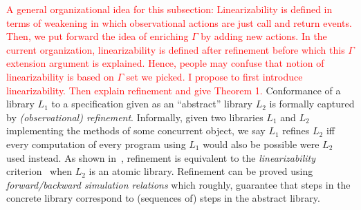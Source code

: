 \textcolor{red}{A general organizational idea for  this subsection: Linearizability is defined in terms of weakening in which observational actions are just call and return events. Then, we put forward the idea of enriching $\Gamma$ by adding new actions. In the current organization, linearizability is defined after refinement before which this $\Gamma$ extension argument is explained. Hence, people may confuse that notion of linearizability is based on $\Gamma$ set we picked. I propose to first introduce linearizability. Then explain refinement and give Theorem 1.}
Conformance of a library $L_1$ to a specification given as an ``abstract'' library $L_2$ 
is formally captured by \emph{(observational) refinement}. Informally, given two libraries
$L_1$ and $L_2$ implementing the methods of some concurrent object, we
say $L_1$ refines $L_2$ if{f} every computation of every program
using $L_1$ would also be possible were $L_2$ used instead. As shown in~\citet{journals/tcs/FilipovicORY10,DBLP:conf/popl/BouajjaniEEH15},
refinement is equivalent to the \emph{linearizability} criterion~\cite{journals/toplas/HerlihyW90} when $L_2$ is an atomic library. 
Refinement can be proved using \emph{forward/backward simulation relations} which roughly, guarantee that steps
in the concrete library correspond to (sequences of) steps in the abstract library.


